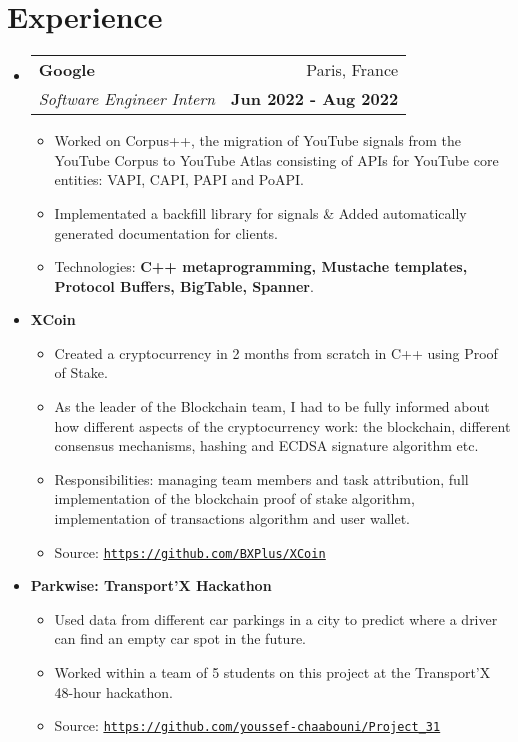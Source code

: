 \documentclass[letterpaper,11pt]{article}
\makeatletter
\newcommand{\resumeItem}[2]{
  \item\small{
    \textbf{#1}{#2 \vspace{-2pt}}
  }
}
\newcommand{\resumeSmallSubheading}[1]{
  \item
    \textbf{#1}\vspace{-5pt}
}
\newcommand{\resumeSubheading}[4]{
  \item
    \begin{tabular*}{0.97\textwidth}[t]{l@{\extracolsep{\fill}}r}
      \textbf{#1} & #2 \\
      \textit{\small#3} & \textbf{\small #4} \\
    \end{tabular*}\vspace{-5pt}
}
\newcommand{\resumeSubHeadingListStart}{\begin{itemize}[leftmargin=*]}
\newcommand{\resumeSubHeadingListEnd}{\end{itemize}}
\newcommand{\resumeItemListStart}{\begin{itemize}}
\newcommand{\resumeItemListEnd}{\end{itemize}\vspace{-5pt}}
\makeatother
\begin{document}
\section{Experience}
  \resumeSubHeadingListStart
    \resumeSubheading
      {Google}{Paris, France}
      {Software Engineer Intern}{Jun 2022 - Aug 2022}
      \resumeItemListStart
        \resumeItem{}
          {Worked on Corpus++, the migration of YouTube signals from the YouTube Corpus to YouTube Atlas consisting of APIs for YouTube core entities: VAPI, CAPI, PAPI and PoAPI.}
        \resumeItem{}
          {Implementated a backfill library for signals \& Added  automatically generated documentation for clients.}
        \resumeItem{}
          {Technologies: \textbf{C++ metaprogramming, Mustache templates, Protocol Buffers, BigTable, Spanner}.}
      \resumeItemListEnd
    \resumeSmallSubheading{XCoin}
      \resumeItemListStart
        \resumeItem{}
          {Created a cryptocurrency in 2 months from scratch in C++ using Proof of Stake.}
        \resumeItem{}
          {As the leader of the Blockchain team, I had to be fully informed about how different aspects of the cryptocurrency work: the blockchain, different consensus mechanisms, hashing and ECDSA signature algorithm etc.}
        \resumeItem{}
          {Responsibilities: managing team members and task attribution, full implementation of the blockchain proof of stake algorithm, implementation of transactions algorithm and user wallet.}
        \resumeItem{}
          {Source: \texttt{\underline{\href{https://github.com/BXPlus/XCoin}{https://github.com/BXPlus/XCoin}}}}
      \resumeItemListEnd
    \resumeSmallSubheading{Parkwise: Transport'X Hackathon}
      \resumeItemListStart
        \resumeItem{}
          {Used data from different car parkings in a city to predict where a driver can find an empty car spot in the future.}
        \resumeItem{}
          {Worked within a team of 5 students on this project at the Transport'X 48-hour hackathon.}
        \resumeItem{}
          {Source: \texttt{\underline{\href{https://github.com/youssef-chaabouni/Project_31}{https://github.com/youssef-chaabouni/Project\_31}}}}
      \resumeItemListEnd

  \resumeSubHeadingListEnd


\end{document}
